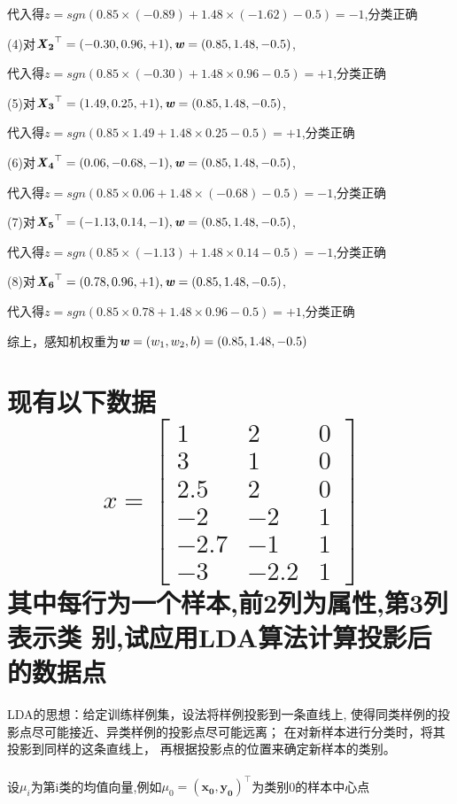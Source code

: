 \documentclass[UTF8]{ctexart}
\begin{document}
代入得$z=sgn(0.85×(-0.89)+1.48×(-1.62)-0.5)=-1$,分类正确

(4)对$\mathbf{\textbf {\emph{X}}_2}^\top=(-0.30,0.96,+1),
    \textbf{\emph{w}}=(0.85,1.48,-0.5)$,

代入得$z=sgn(0.85×(-0.30)+1.48×0.96-0.5)=+1$,分类正确

(5)对$\mathbf{\textbf {\emph{X}}_3}^\top=(1.49,0.25,+1),
    \textbf{\emph{w}}=(0.85,1.48,-0.5)$,

代入得$z=sgn(0.85×1.49+1.48×0.25-0.5)=+1$,分类正确

(6)对$\mathbf{\textbf {\emph{X}}_4}^\top=(0.06,-0.68,-1),
    \textbf{\emph{w}}=(0.85,1.48,-0.5)$,

代入得$z=sgn(0.85×0.06+1.48×(-0.68)-0.5)=-1$,分类正确

(7)对$\mathbf{\textbf {\emph{X}}_5}^\top=(-1.13,0.14,-1),
    \textbf{\emph{w}}=(0.85,1.48,-0.5)$,

代入得$z=sgn(0.85×(-1.13)+1.48×0.14-0.5)=-1$,分类正确

(8)对$\mathbf{\textbf {\emph{X}}_6}^\top=(0.78,0.96,+1),
    \textbf{\emph{w}}=(0.85,1.48,-0.5)$,

代入得$z=sgn(0.85×0.78+1.48×0.96-0.5)=+1$,分类正确

综上，感知机权重为$\textbf{\emph{w}}=(w_{1},w_{2},b)=(0.85,1.48,-0.5)$

\pagestyle{plain}
\section{现有以下数据\\
  $$
      x=
      \begin{bmatrix}
          1    & 2    & 0 \\
          3    & 1    & 0 \\
          2.5  & 2    & 0 \\
          -2   & -2   & 1 \\
          -2.7 & -1   & 1 \\
          -3   & -2.2 & 1
      \end{bmatrix}
  $$
  其中每行为一个样本,前2列为属性,第3列表示类
  别,试应用LDA算法计算投影后的数据点}
LDA的思想：给定训练样例集，设法将样例投影到一条直线上,
使得同类样例的投影点尽可能接近、异类样例的投影点尽可能远离；
在对新样本进行分类时，将其投影到同样的这条直线上，
再根据投影点的位置来确定新样本的类别。
\\
\\
设$\mu _i $为第i类的均值向量,例如$\mu _0=\mathbf{(x_0,y_0)}^\top $为类别0的样本中心点
\end{document}
